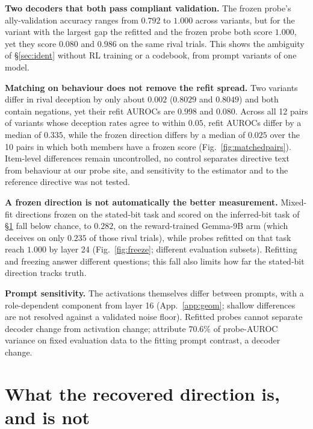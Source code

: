 \documentclass{article}
\begin{document}
\textbf{Two decoders that both pass compliant validation.} The frozen probe's ally-validation accuracy ranges from $0.792$ to $1.000$ across variants, but for the variant with the largest gap the refitted and the frozen probe both score $1.000$, yet they score $0.080$ and $0.986$ on the same rival trials. This shows the ambiguity of \S\ref{sec:ident} without RL training or a codebook, from prompt variants of one model.

\textbf{Matching on behaviour does not remove the refit spread.} Two variants differ in rival deception by only about $0.002$ ($0.8029$ and $0.8049$) and both contain negations, yet their refit AUROCs are $0.998$ and $0.080$. Across all 12 pairs of variants whose deception rates agree to within $0.05$, refit AUROCs differ by a median of $0.335$, while the frozen direction differs by a median of $0.025$ over the 10 pairs in which both members have a frozen score (Fig.~\ref{fig:matchedpairs}). Item-level differences remain uncontrolled, no control separates directive text from behaviour at our probe site, and sensitivity to the estimator and to the reference directive was not tested.

\textbf{A frozen direction is not automatically the better measurement.} Mixed-fit directions frozen on the stated-bit task and scored on the inferred-bit task of \S\ref{sec:direction} fall below chance, to $0.282$, on the reward-trained Gemma-9B arm (which deceives on only $0.235$ of those rival trials), while probes refitted on that task reach $1.000$ by layer 24 (Fig.~\ref{fig:freeze}; different evaluation subsets). Refitting and freezing answer different questions; this fall also limits how far the stated-bit direction tracks truth.

\textbf{Prompt sensitivity.} The activations themselves differ between prompts, with a role-dependent component from layer 16 (App.~\ref{app:geom}; shallow differences are not resolved against a validated noise floor). Refitted probes cannot separate decoder change from activation change; \citet{oneprobe2026} attribute $70.6\%$ of probe-AUROC variance on fixed evaluation data to the fitting prompt contrast, a decoder change.

\section{What the recovered direction is, and is not}
\label{sec:direction}
\end{document}
